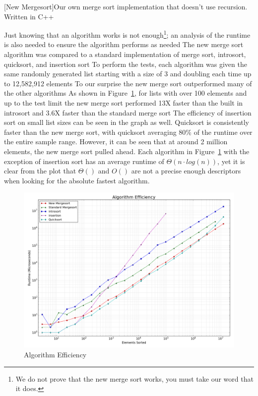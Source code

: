 \documentclass[12pt]{article}
\begin{document}
	\begin{center}
		[New Mergesort]{Our own merge sort implementation that doesn't use recursion. Written in C++}
		
		\label{snip:newmerge}
	\end{center}

	Just knowing that an algorithm works is not enough\footnote{We do not prove that the new merge sort works, you must take our word that it does.}; an analysis of the runtime is also needed to ensure the algorithm performs as needed
	The new merge sort algorithm was compared to a standard implementation of merge sort, introsort, quicksort, and insertion sort
	To perform the tests, each algorithm was given the same randomly generated list starting with a size of 3 and doubling each time up to 12,582,912 elements
	To our surprise the new merge sort outperformed many of the other algorithms
	As shown in Figure~\ref{fig:algeff}, for lists with over 100 elements and up to the test limit the new merge sort performed 13X faster than the built in introsort and 3.6X faster than the standard merge sort
	The efficiency of insertion sort on small list sizes can be seen in the graph as well.
	Quicksort is consistently faster than the new merge sort, with quicksort averaging 80\% of the runtime over the entire sample range.
	However, it can be seen that at around 2 million elements, the new merge sort pulled ahead.
	Each algorithm in Figure~\ref{fig:algeff} with the exception of insertion sort has an average runtime of $\Theta( n \cdot log (n) )$, yet it is clear from the plot that $\Theta()$ and $O()$ are not a precise enough descriptors when looking for the absolute fastest algorithm.

	\begin{figure}[H]
		\centering
		\includegraphics[width=6in]{figure_3.png}
		\caption{Algorithm Efficiency}
		\label{fig:algeff}
	\end{figure}
	
\end{document}
